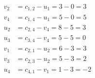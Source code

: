\[
\begin{aligned}
v_{2} &= c_{1,2} - u_{1} = 3 - 0 = 3 \\
v_{4} &= c_{1,4} - u_{1} = 5 - 0 = 5 \\
u_{2} &= c_{2,4} - v_{4} = 8 - 5 = 3 \\
u_{3} &= c_{3,4} - v_{4} = 5 - 5 = 0 \\
v_{1} &= c_{2,1} - u_{2} = 6 - 3 = 3 \\
v_{3} &= c_{2,3} - u_{2} = 5 - 3 = 2 \\
u_{4} &= c_{4,1} - v_{1} = 1 - 3 = -2 \\
\end{aligned}
\]

